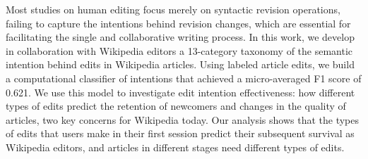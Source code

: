 Most studies on human editing focus merely on syntactic revision operations, failing to capture the intentions behind revision changes, which are essential for facilitating the single and collaborative writing process. In this work, we develop in collaboration with Wikipedia editors a 13-category taxonomy of the semantic intention behind edits in Wikipedia articles. Using labeled article edits, we build a computational classifier of intentions that achieved a micro-averaged F1 score of 0.621. We use this model to investigate edit intention effectiveness: how different types of edits predict the retention of newcomers and changes in the quality of articles, two key concerns for Wikipedia today. Our analysis shows that the types of edits that users make in their first session predict their subsequent survival as Wikipedia editors, and articles in different stages need different types of edits.
